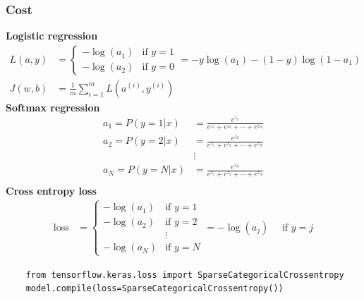 \subsubsection*{Cost}
\noindent
\textbf{Logistic regression}
\begin{align*}
    L(a, y) &= \begin{cases} -\log(a_1) & \text{if } y = 1\\ 
        -\log(a_2) & \text{if } y = 0 \end{cases}=  -y \log(a_1) - (1 - y) \log(1 - a_1)\\
    J(w, b) &= \frac{1}{m}\sum_{i=1}^{m}L(a^{(i)}, y^{(i)})
\end{align*}
\textbf{Softmax regression}
\begin{align*}
    a_1 = P(y=1|x) &= \frac{e^{z_1}}{e^{z_1} + e^{z_2} + \cdots + e^{z_N}}\\
    a_2 = P(y=2|x) &= \frac{e^{z_2}}{e^{z_1} + e^{z_2} + \cdots + e^{z_N}}\\
    &\vdots\\
    a_N = P(y=N|x) &= \frac{e^{z_N}}{e^{z_1} + e^{z_2} + \cdots + e^{z_N}}\\
\end{align*}
\textbf{Cross entropy loss}
\begin{align*}
    \mathrm{loss} &= 
    \begin{cases}
        -\log(a_1) & \text{if } y = 1\\
        -\log(a_2) & \text{if } y = 2\\
        &\vdots \\
        -\log(a_N) & \text{if } y = N
    \end{cases}
    = -\log(a_j) \quad \text{ if } y = j
\end{align*}

\vspace{2em}
\begin{verbatim}
    from tensorflow.keras.loss import SparseCategoricalCrossentropy
    model.compile(loss=SparseCategoricalCrossentropy())
\end{verbatim}

